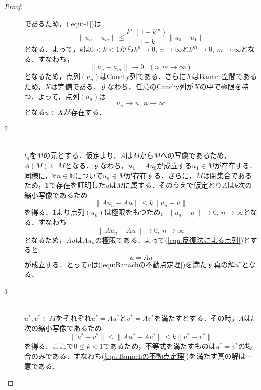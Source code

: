 \documentclass[11pt,a4paper,titlepage]{jsreport}
\theoremstyle{definition}
\begin{document}
\begin{proof}
\begin{description}
      であるため，(\ref{equ:-1})は
      \begin{equation}
        \|u_{n}-u_{m}\| \leq \frac{k^n(1-k^m)}{1-k} \|u_0-u_1\|
      \end{equation}
      となる．よって，$k$は$0<k<1$から$k^n\rightarrow 0,\ n\rightarrow \infty$と$k^m\rightarrow 0,\ m\rightarrow \infty$となる．すなわち，
      \begin{equation*}
        \|u_{n}-u_{m}\| \rightarrow 0,\ (n,m\rightarrow \infty)
      \end{equation*}
      となるため，点列$(u_n)$はCauchy列である．さらに$X$はBanach空間であるため，$X$は完備である．すなわち，任意のCauchy列が$X$の中で極限を持つ．よって，点列$(u_n)$は
      \begin{equation*}
        u_n\rightarrow u,\ n\rightarrow \infty
      \end{equation*}
      となる$u \in X$が存在する．

    \item[2]
      \quad\\
      $t_0$を$M$の元とする．仮定より，$A$は$M$から$M$への写像であるため，$A(M)\subseteq M$となる．すなわち，$u_1=Au_0$が成立する$u_1\in M$が存在する．同様に，$\forall n \in \mathbb{N}$について$u_n\in M$が存在する．さらに，$M$は閉集合であるため，\textbf{1}で存在を証明した$u$は$M$に属する．そのうえで仮定とり$A$は$k$次の縮小写像であるため
      \begin{equation*}
        \|Au_n-Au\|\leq k\|u_n-u\|
      \end{equation*}
      を得る．\textbf{1}より点列$(u_n)$は極限をもつため，$\|u_n-u\|\rightarrow 0,\ n\rightarrow \infty$となる．すなわち
      \begin{equation*}
        \|Au_n-Au\|\rightarrow 0,\ n\rightarrow \infty
      \end{equation*}
      となるため，$Au$は$Au_n$の極限である．よって(\ref{equ:反復法による点列})とすると
      \begin{equation*}
        u=Au
      \end{equation*}
      が成立する．とって$u$は(\ref{equ:Banachの不動点定理})を満たす真の解$u^*$となる．

    \item[3]
      \quad\\
      $u^*,v^*\in M$をそれぞれ$u^*=Au^*$と$v^*=Av^*$を満たすとする．その時，$A$は$k$次の縮小写像であるため
      \begin{equation*}
        \|u^*-v^*\| \leq \|Au^*-Av^*\| \leq k\|u^*-v^*\|
      \end{equation*}
      を得る．ここで$0\leq k<1$であるため，不等式を満たすものは$u^*=v^*$の場合のみである．すなわち(\ref{equ:Banachの不動点定理})を満たす真の解は一意である．
  \end{description}

\end{proof}
\end{document}
